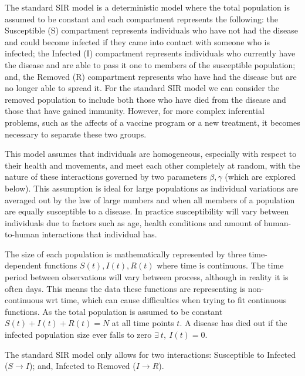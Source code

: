 \documentclass[11pt,a4paper]{article}
\theoremstyle{break}
\begin{document}
  \par The standard SIR model \cite[]{mathematical_modelling_and_prediction_in_infectious_disease_epidemiology} is a deterministic model where the total population is assumed to be constant and each compartment represents the following: the Susceptible (S) compartment represents individuals who have not had the disease and could become infected if they came into contact with someone who is infected; the Infected (I) compartment represents individuals who currently have the disease and are able to pass it one to members of the susceptible population; and, the Removed (R) compartment represents who have had the disease but are no longer able to spread it. For the standard SIR model we can consider the removed population to include both those who have died from the disease and those that have gained immunity. However, for more complex inferential problems, such as the affects of a vaccine program or a new treatment, it becomes necessary to separate these two groups.

  \par This model assumes that individuals are homogeneous, especially with respect to their health and movements, and meet each other completely at random, with the nature of these interactions governed by two parameters $\beta,\gamma$ (which are explored below). This assumption is ideal for large populations as individual variations are averaged out by the law of large numbers and when all members of a population are equally susceptible to a disease. In practice susceptibility will vary between individuals due to factors such as age, health conditions and amount of human-to-human interactions that individual has.

  \par The size of each population is mathematically represented by three time-dependent functions $S(t),I(t),R(t)$ where time is continuous. The time period between observations will vary between process, although in reality it is often days. This means the data these functions are representing is non-continuous wrt time, which can cause difficulties when trying to fit continuous functions. As the total population is assumed to be constant $S(t)+I(t)+R(t)=N$ at all time points $t$. A disease has died out if the infected population size ever falls to zero $\exists\ t,\ I(t)=0$.

  \par The standard SIR model only allows for two interactions: Susceptible to Infected ($S\to I$); and, Infected to Removed ($I\to R$).
\end{document}
